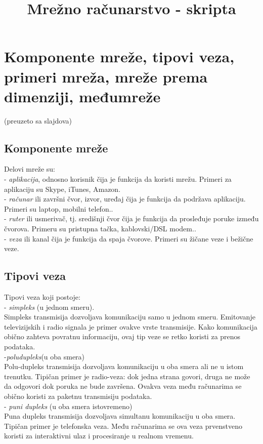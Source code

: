 \documentclass{article} %
\title{Mrežno računarstvo - skripta}
\begin{document}

\maketitle %
\newpage %

\section{Komponente mreže, tipovi veza, primeri mreža, mreže prema dimenziji, međumreže}
(preuzeto sa slajdova)
\subsection{Komponente mreže}
Delovi mreže su:\\ 
- \textit{aplikacija}, odnosno korisnik čija je funkcija da koristi mrežu. Primeri za aplikaciju su Skype, iTunes, Amazon.\\
- \textit{računar} ili završni čvor, izvor, uređaj čija je funkcija da podržava aplikaciju. Primeri su laptop, mobilni telefon..\\
- \textit{ruter} ili usmerivač, tj. središnji čvor čija je funkcija da prosleđuje poruke između  čvorova. Primeru su pristupna tačka, kablovski/DSL modem..\\
- \textit{veza} ili kanal čija je funkcija da spaja čvorove. Primeri su žičane veze i bežične veze.
\subsection{Tipovi veza}
Tipovi veza koji postoje: \\
- \textit{simpleks} (u jednom smeru).\\
Simpleks transmisija dozvoljava komunikaciju samo u jednom smeru. Emitovanje televizijskih i radio signala je primer ovakve vrste transmisije. Kako komunikacija obično zahteva povratnu informaciju, ovaj tip veze se retko koristi za prenos podataka. \\
-\textit{poludupleks}(u oba smera) \\
Polu-dupleks transmisija dozvoljava komunikaciju u oba smera ali ne u istom trenutku. Tipičan primer je radio-veza: dok jedna strana govori, druga ne može da odgovori dok poruka ne bude završena. Ovakva veza među računarima se obično koristi za paketnu transmisiju podataka. \\
- \textit{puni dupleks} (u oba smera istovremeno)\\
Puna dupleks transmisija dozvoljava simultanu komunikaciju u oba smera. Tipičan
primer je telefonska veza. Među računarima se ova veza prvenstveno koristi za interaktivni ulaz i procesiranje u realnom vremenu.\\
\end{document}
